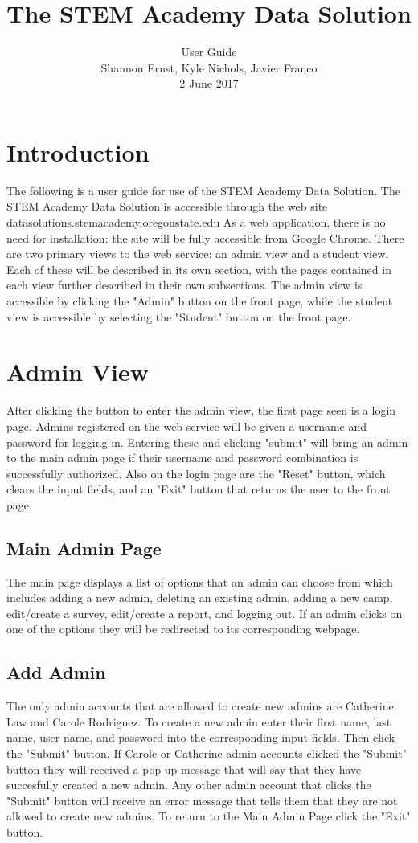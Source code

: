 \documentclass[letterpaper,10pt,serif, draftclsnofoot,onecolumn, compsoc, titlepage]{IEEEtran}
\title{The STEM Academy Data Solution}
\author{User Guide \\ Shannon Ernst, Kyle Nichols, Javier Franco\\ 2 June 2017}
\begin{document}
\maketitle

\newpage
\tableofcontents
\newpage

\section{Introduction}
The following is a user guide for use of the STEM Academy Data Solution.
The STEM Academy Data Solution is accessible through the web site datasolutions.stemacademy.oregonstate.edu
As a web application, there is no need for installation: the site will be fully accessible from Google Chrome.
There are two primary views to the web service: an admin view and a student view.
Each of these will be described in its own section, with the pages contained in each view further described in their own subsections.
The admin view is accessible by clicking the "Admin" button on the front page, while the student view is
 accessible by selecting the "Student" button on the front page.

\section{Admin View}
After clicking the button to enter the admin view, the first page seen is a login page.
Admins registered on the web service will be given a username and password for logging in.
Entering these and clicking "submit" will bring an admin to the main admin page if their username
 and password combination is successfully authorized. Also on the login page are the "Reset" button,
 which clears the input fields, and an "Exit" button that returns the user to the front page.
\subsection{Main Admin Page}
The main page displays a list of options that an admin can choose from which includes adding a new admin, deleting an existing admin, adding a new camp, edit/create a survey, edit/create a report, and logging out.
If an admin clicks on one of the options they will be redirected to its corresponding webpage. 
\subsection{Add Admin}
The only admin accounts that are allowed to create new admins are Catherine Law and Carole Rodriguez.
To create a new admin enter their first name, last name, user name, and password into the corresponding input fields.
Then click the "Submit" button. If Carole or Catherine admin accounts clicked the "Submit" button they will received a pop up message that will say that they have succesfully created a new admin.
Any other admin account that clicks the "Submit" button will receive an error message that tells them that they are not allowed to create new admins.
To return to the Main Admin Page click the "Exit" button. 
\end{document}
